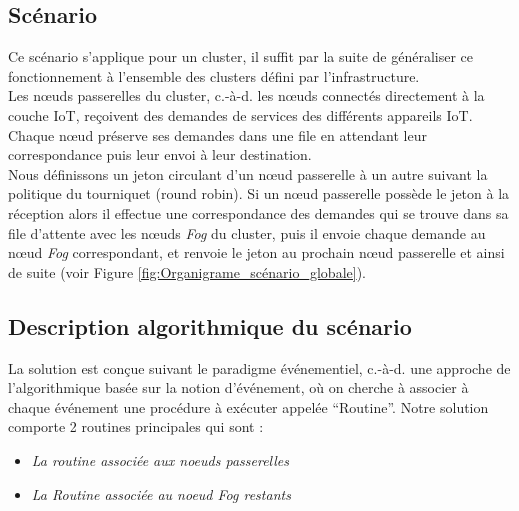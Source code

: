 \subsection{Scénario}
Ce scénario s'applique pour un cluster, il suffit par la suite de généraliser ce fonctionnement à l'ensemble des clusters défini par l'infrastructure.\\
Les nœuds passerelles du cluster, c.-à-d. les nœuds connectés directement à la couche IoT, reçoivent des demandes de services des différents appareils IoT. Chaque nœud préserve ses demandes dans une file en attendant leur correspondance puis leur envoi à leur destination.\\
Nous définissons un jeton circulant d'un nœud passerelle à un autre suivant la politique du tourniquet (round robin). Si un nœud passerelle possède le jeton à la réception alors il effectue une correspondance des demandes qui se trouve dans sa file d'attente avec les nœuds \emph{Fog} du cluster, puis il envoie chaque demande au nœud \emph{Fog} correspondant, et  renvoie le jeton au prochain nœud passerelle et ainsi de suite (voir Figure \ref{fig:Organigrame_scénario_globale}).

\subsection{Description algorithmique du scénario}
La solution est conçue suivant le paradigme événementiel, c.-à-d. une approche de l'algorithmique basée sur la notion d'événement, où on cherche à associer à chaque événement une procédure à exécuter appelée “Routine”.   
Notre solution comporte 2 routines principales qui sont :
\begin{itemize}
    \item \emph{La routine associée aux noeuds passerelles}
    \item \emph{La Routine associée au noeud Fog restants}
\end{itemize}


